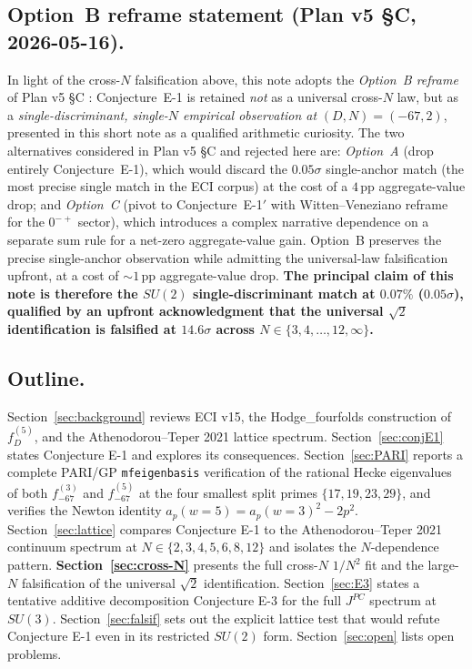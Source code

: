\documentclass[11pt,a4paper]{amsart}
\theoremstyle{definition}
\begin{document}
\subsection*{Option~B reframe statement (Plan v5 \S C, 2026-05-16).}
In light of the cross-$N$ falsification above, this note adopts the
\emph{Option~B reframe} of Plan v5 \S C \cite{PlanV5C2026}:
Conjecture~E-1 is retained \emph{not} as a universal cross-$N$ law,
but as a \emph{single-discriminant, single-$N$ empirical observation
at} $(D, N) = (-67, 2)$, presented in this short note as a qualified
arithmetic curiosity. The two alternatives considered in Plan v5
\S C and rejected here are: \emph{Option~A} (drop entirely
Conjecture~E-1), which would discard the $0.05\sigma$ single-anchor
match (the most precise single match in the ECI corpus) at the cost
of a $4\,\mathrm{pp}$ aggregate-value drop; and \emph{Option~C}
(pivot to Conjecture~E-1$'$ with Witten--Veneziano reframe for the
$0^{-+}$ sector), which introduces a complex narrative dependence on
a separate sum rule for a net-zero aggregate-value gain. Option~B
preserves the precise single-anchor observation while admitting the
universal-law falsification upfront, at a cost of $\sim 1\,\mathrm{pp}$
aggregate-value drop. \textbf{The principal claim of this note is
therefore the $SU(2)$ single-discriminant match at $0.07\%$ ($0.05\sigma$),
qualified by an upfront acknowledgment that the universal $\sqrt{2}$
identification is falsified at $14.6\sigma$ across $N \in \{3,4,\dots,12,\infty\}$.}

\subsection*{Outline.}
Section~\ref{sec:background} reviews ECI v15, the Hodge\_fourfolds construction
of $f_{D}^{(5)}$, and the Athenodorou--Teper 2021 lattice spectrum.
Section~\ref{sec:conjE1} states Conjecture E-1 and explores its consequences.
Section~\ref{sec:PARI} reports a complete PARI/GP \texttt{mfeigenbasis}
verification of the rational Hecke eigenvalues of both $f_{-67}^{(3)}$ and
$f_{-67}^{(5)}$ at the four smallest split primes $\{17, 19, 23, 29\}$, and
verifies the Newton identity $a_{p}(w=5) = a_{p}(w=3)^{2} - 2p^{2}$.
Section~\ref{sec:lattice} compares Conjecture E-1 to the
Athenodorou--Teper 2021 continuum spectrum at $N \in \{2, 3, 4, 5, 6, 8, 12\}$
and isolates the $N$-dependence pattern.
\textbf{Section~\ref{sec:cross-N}} presents the full cross-$N$ $1/N^{2}$ fit
and the large-$N$ falsification of the universal $\sqrt{2}$ identification.
Section~\ref{sec:E3} states a tentative additive decomposition Conjecture E-3
for the full $J^{PC}$ spectrum at $SU(3)$.
Section~\ref{sec:falsif} sets out the explicit lattice test that would refute
Conjecture E-1 even in its restricted $SU(2)$ form. Section~\ref{sec:open} lists open problems.
\end{document}
